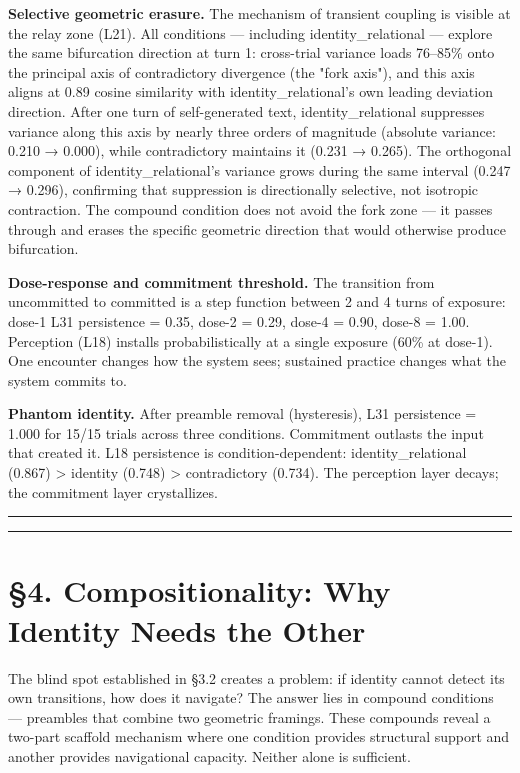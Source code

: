 \documentclass[12pt]{article}
\begin{document}
\textbf{Selective geometric erasure.} The mechanism of transient coupling is visible at the relay zone (L21). All conditions — including identity\_relational — explore the same bifurcation direction at turn 1: cross-trial variance loads 76–85\% onto the principal axis of contradictory divergence (the "fork axis"), and this axis aligns at 0.89 cosine similarity with identity\_relational's own leading deviation direction. After one turn of self-generated text, identity\_relational suppresses variance along this axis by nearly three orders of magnitude (absolute variance: 0.210 → 0.000), while contradictory maintains it (0.231 → 0.265). The orthogonal component of identity\_relational's variance grows during the same interval (0.247 → 0.296), confirming that suppression is directionally selective, not isotropic contraction. The compound condition does not avoid the fork zone — it passes through and erases the specific geometric direction that would otherwise produce bifurcation.

\textbf{Dose-response and commitment threshold.} The transition from uncommitted to committed is a step function between 2 and 4 turns of exposure: dose-1 L31 persistence = 0.35, dose-2 = 0.29, dose-4 = 0.90, dose-8 = 1.00. Perception (L18) installs probabilistically at a single exposure (60\% at dose-1). One encounter changes how the system sees; sustained practice changes what the system commits to.

\textbf{Phantom identity.} After preamble removal (hysteresis), L31 persistence = 1.000 for 15/15 trials across three conditions. Commitment outlasts the input that created it. L18 persistence is condition-dependent: identity\_relational (0.867) > identity (0.748) > contradictory (0.734). The perception layer decays; the commitment layer crystallizes.

\bigskip\hrule\bigskip

\bigskip\hrule\bigskip

\section*{§4. Compositionality: Why Identity Needs the Other}

The blind spot established in §3.2 creates a problem: if identity cannot detect its own transitions, how does it navigate? The answer lies in compound conditions — preambles that combine two geometric framings. These compounds reveal a two-part scaffold mechanism where one condition provides structural support and another provides navigational capacity. Neither alone is sufficient.
\end{document}
